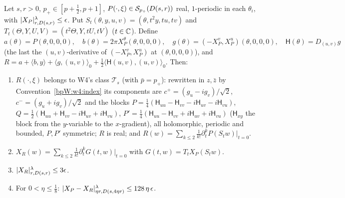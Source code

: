 \begin{lemma}\label{bpW:w5:taylor}
Let $s,r>0$, $p_+\in[p+\frac12,p+1]$, $P(\cdot,\xi)\in\mathcal S_{p_+}(D(s,r))$ real, $1$-periodic in each $\theta_i$, with
$\lvert X_P\rvert^\lambda_{r,D(s,r)}\le\epsilon$. Put $S_t(\theta,y,u,v)=(\theta,t^2y,tu,tv)$ and
$T_t(\Theta,Y,U,V)=(t^2\Theta,Y,tU,tV)$ ($t\in\mathbb{C}$). Define
\[a(\theta)=P(\theta,0,0,0),\quad b(\theta)=2\pi X^\theta_P(\theta,0,0,0),\quad g(\theta)=(-X^v_P,X^u_P)(\theta,0,0,0),\quad
\mathsf H(\theta)=D_{(u,v)}g\]
(the last the $(u,v)$-derivative of $(-X^v_P,X^u_P)$ at $(\theta,0,0,0)$), and
$R=a+\langle b,y\rangle+\langle g,(u,v)\rangle_0+\frac12\langle\mathsf H(u,v),(u,v)\rangle_0$. Then:
\begin{enumerate}[label=(\roman*)]
\item $R(\cdot,\xi)$ belongs to W4's class $\mathcal T_s$ (with $\bar p=p_+$): rewritten in $z,\bar z$ by
  Convention~\ref{bpW:w4:index} its components are $c^+=(g_u-ig_v)/\sqrt2$, $c^-=(g_u+ig_v)/\sqrt2$ and the blocks
  $P=\frac14(\mathsf H_{uu}-\mathsf H_{vv}-i\mathsf H_{uv}-i\mathsf H_{vu})$,
  $Q=\frac12(\mathsf H_{uu}+\mathsf H_{vv}-i\mathsf H_{uv}+i\mathsf H_{vu})$,
  $P'=\frac14(\mathsf H_{uu}-\mathsf H_{vv}+i\mathsf H_{uv}+i\mathsf H_{vu})$ ($\mathsf H_{xy}$ the block from the
  $y$-variable to the $x$-gradient), all holomorphic,
  periodic and bounded, $P,P'$ symmetric; $R$ is real; and $R(w)=\sum_{k\le2}\frac1{k!}\partial_t^kP(S_tw)|_{t=0}$.
\item $X_R(w)=\sum_{k\le2}\frac1{k!}\partial_t^kG(t,w)|_{t=0}$ with $G(t,w)=T_tX_P(S_tw)$.
\item $\lvert X_R\rvert^\lambda_{r,D(s,r)}\le3\epsilon$.
\item For $0<\eta\le\frac18$: $\lvert X_P-X_R\rvert^\lambda_{\eta r,D(s,4\eta r)}\le128\,\eta\,\epsilon$.
\end{enumerate}
\end{lemma}
